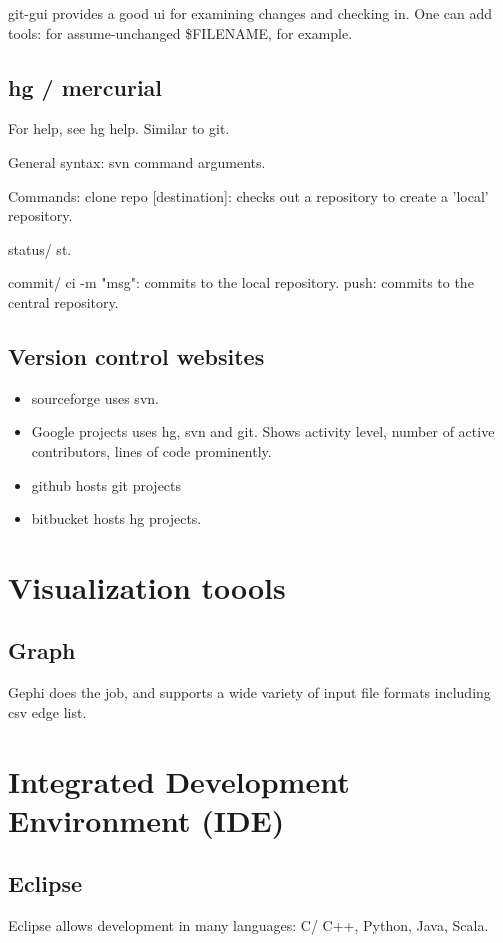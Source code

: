 \documentclass[oneside, article]{memoir}
\begin{document}
git-gui provides a good ui for examining changes and checking in. One can add tools: for assume-unchanged \$FILENAME, for example.

\tbc

\section{hg / mercurial}
For help, see hg help. Similar to git.

General syntax: svn command arguments.

Commands: clone repo [destination]: checks out a repository to create a 'local' repository.

status/ st.

commit/ ci -m "msg": commits to the local repository. push: commits to the central repository.

\section{Version control websites}
\begin{itemize}
\item sourceforge uses svn.
\item Google projects uses hg, svn and  git.
  \subitem Shows activity level, number of active contributors, lines of code prominently.
\item github hosts git projects
\item bitbucket hosts hg projects.
\end{itemize}

\chapter{Visualization toools}
\section{Graph}
Gephi does the job, and supports a wide variety of input file formats including csv edge list.

\chapter{Integrated Development Environment (IDE)}
\section{Eclipse}
Eclipse allows development in many languages: C/ C++, Python, Java, Scala.
\end{document}
